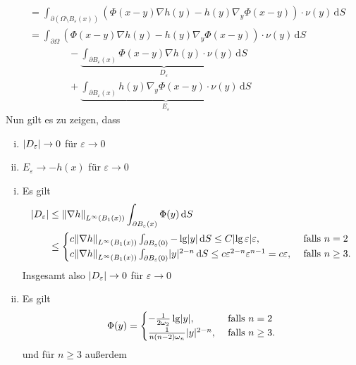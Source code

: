 \begin{beweis}
\begin{align*}
		 &= \int_{\partial ( \Omega \setminus B _{\varepsilon}(x))}^{} \left( \Phi(x-y)  \nabla h(y) - h(y)  \nabla_y \Phi(x-y) \right) \cdot \nu(y) \,\mathrm{d}S \\
		 &= \int_{\partial \Omega}^{} (\Phi(x-y)  \nabla h(y) - h(y)  \nabla_y \Phi(x-y)) \cdot \nu(y) \,\mathrm{d}S \\
		 & \qquad \qquad - \underset{D_{\varepsilon}}{\underbrace{\int_{\partial B_{\varepsilon}(x)}^{} \Phi(x-y)  \nabla h(y) \cdot \nu(y) \,\mathrm{d}S}} \\
		 & \qquad \qquad + \underset{E_{\varepsilon}}{\underbrace{\int_{\partial B_{\varepsilon}(x)}^{} h(y)  \nabla_y \Phi(x-y) \cdot \nu(y) \,\mathrm{d}S}}
	\end{align*}
	Nun gilt es zu zeigen, dass
	\begin{enumerate}[(i)]
		\item $\lvert D_{\varepsilon}\rvert \to 0$ für $\varepsilon \to 0$
		\item $E_\varepsilon \to -h(x)$ für $\varepsilon \to 0$
	\end{enumerate}
	\begin{beweis}
		\begin{enumerate}[(i)]
			\item Es gilt
			\begin{align*}
				\abs{D_{\varepsilon}} &\leq \norm{  \nabla h}_{L^{\infty}(B_1(x))} \int_{ \partial B_{\varepsilon}(x)}^{} \Phi(y) \,\mathrm{d}S \\ &\leq \begin{cases}
					c \norm{ \nabla h}_{L^{\infty}(B_1(x))} \int_{\partial B_{\varepsilon}(0)}^{} 
					- \lg \abs{y} \,\mathrm{d}S \leq C \abs{ \lg \varepsilon}\varepsilon, &\text{ falls }n=2\\
					c \norm{ \nabla h}_{L^{\infty}(B_1(x))} \int_{\partial B_{\varepsilon}(0)}^{} \abs{y}^{2-n} \,\mathrm{d}S 
					\leq  c \varepsilon^{2-n} \varepsilon^{n-1} = c \varepsilon , &\text{ falls } n \geq 3.
				\end{cases}
			\end{align*}
			Insgesamt also $\lvert D_{\varepsilon}\rvert \to 0$ für $\varepsilon \to 0$
			\item Es gilt
			\[
				\Phi(y) = \begin{cases}
					-\frac{1}{2 \omega_2} \lg \lvert y\rvert, &\text{ falls }n=2\\
					\frac{1}{n(n-2)\omega_n} \lvert y\rvert^{2-n} , &\text{ falls } n \geq 3.
				\end{cases}
			\]
			und für $n \geq  3$ außerdem
			\begin{equation}

\end{equation}
\end{enumerate}
\end{beweis}
\end{beweis}
